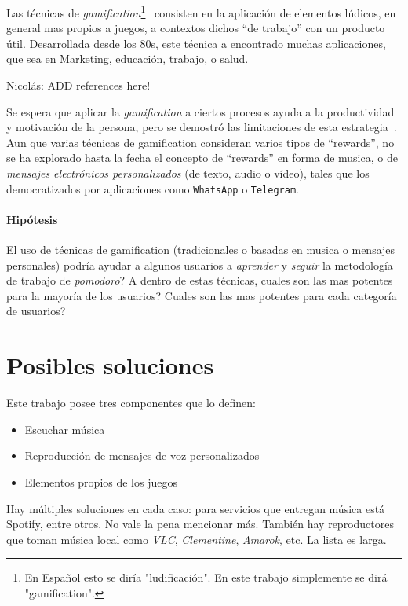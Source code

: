 \documentclass[12pt,letterpaper]{report}
\providecommand{\tightlist}{%
  \setlength{\itemsep}{0pt}\setlength{\parskip}{0pt}}
\let\oldparagraph\paragraph
\renewcommand{\paragraph}[1]{\oldparagraph{#1}\mbox{}}
\begin{document}
Las técnicas de \emph{gamification}\footnote{En Español esto se diría "ludificación". En este trabajo simplemente se dirá "gamification".}~\cite{deterding2011gamification} consisten en la aplicación de elementos lúdicos, en general mas propios a juegos, a contextos dichos ``de trabajo'' con un producto útil.  Desarrollada desde los 80s, este técnica a encontrado muchas aplicaciones, que sea en Marketing, educación, trabajo, o salud.
\begin{TODO}
Nicolás: ADD references here!
\end{TODO}
Se espera que aplicar la \emph{gamification} a ciertos procesos ayuda a la productividad y motivación de la persona, pero se demostró las limitaciones de esta estrategia~\cite{hamari2014gamification}.
%
Aun que varias técnicas de gamification consideran varios tipos de ``rewards'', no se ha explorado hasta la fecha el concepto de ``rewards'' en forma de musica, o de \emph{mensajes electrónicos personalizados} (de texto, audio o vídeo), tales que los democratizados por aplicaciones como \texttt{WhatsApp} o \texttt{Telegram}.

\paragraph{Hipótesis}
El uso de técnicas de gamification (tradicionales o basadas en musica o mensajes personales) podría ayudar a algunos usuarios a \emph{aprender} y \emph{seguir} la metodología de trabajo de \emph{pomodoro}?
A dentro de estas técnicas, cuales son las mas potentes para la mayoría de los usuarios?
Cuales son las mas potentes para cada categoría de usuarios?

\newpage
\hypertarget{posibles-soluciones}{%
\section{Posibles soluciones}\label{posibles-soluciones}}

Este trabajo posee tres componentes que lo definen:

\begin{itemize}
\tightlist
\item
  Escuchar música
\item
  Reproducción de mensajes de voz personalizados
\item
  Elementos propios de los juegos
\end{itemize}

Hay múltiples soluciones en cada caso: para servicios que entregan
música está Spotify, entre otros. No vale la pena mencionar más. También
hay reproductores que toman música local como \emph{VLC},
\emph{Clementine}, \emph{Amarok}, etc. La lista es larga.
\end{document}
